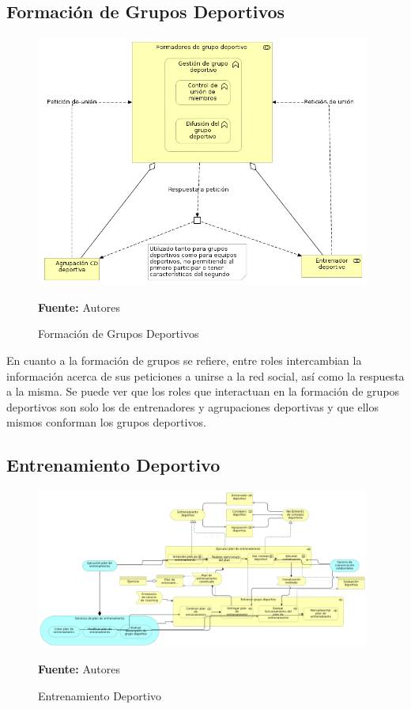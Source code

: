 \subsection{Formación de Grupos Deportivos}

\begin{figure}[!htb]
  \begin{center}
    \includegraphics[width=11cm]{./imagenes/business_functions/formaciongruposdeportivos.png}
    \caption{Formación de Grupos Deportivos}
    \label{fig:bf_formacion_grupos_deportivos}
    \textbf{Fuente:}  Autores
  \end{center}
\end{figure}

En cuanto a la formación de grupos se refiere, entre roles intercambian la información acerca de sus peticiones a unirse a la red social, así como la respuesta a la misma. Se puede ver que los roles que interactuan en la formación de grupos deportivos son solo los de entrenadores y agrupaciones deportivas y que ellos mismos conforman los grupos deportivos.

\subsection{Entrenamiento Deportivo}

\begin{figure}[!htb]
  \begin{center}
    \includegraphics[width=11cm]{./imagenes/business_functions/entrenamientodeportivo.png}
    \caption{Entrenamiento Deportivo}
    \label{fig:bf_entrenamiento_deportivo}
    \textbf{Fuente:}  Autores
  \end{center}
\end{figure}

